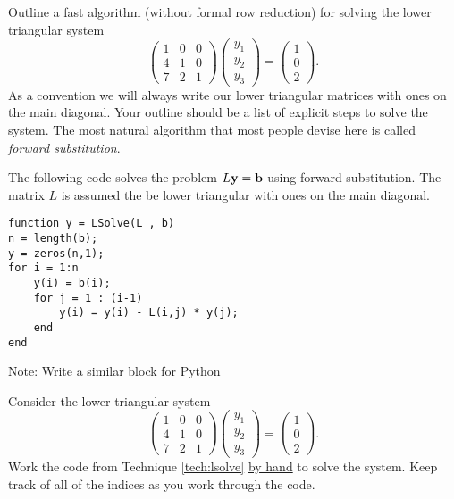 \begin{problem}
    Outline a fast algorithm (without formal row reduction) for solving the lower triangular system
    \[ \begin{pmatrix} 1 & 0 & 0 \\ 4 & 1 & 0 \\ 7 & 2 & 1 \end{pmatrix} \begin{pmatrix}
        y_1 \\ y_2 \\ y_3 \end{pmatrix} = \begin{pmatrix} 1 \\ 0 \\ 2\end{pmatrix}. \]
    As a convention we will always write our lower triangular matrices with ones on the
    main diagonal.  Your outline should be a list of explicit steps to solve the system.
    The most natural algorithm that most people devise here is called {\it forward
    substitution}.
\end{problem}


\begin{technique}\label{tech:lsolve}
    The following code solves the problem $L {\bf y} = {\bf b}$ using forward
    substitution.  The matrix $L$ is assumed the be lower triangular with ones on the main
    diagonal.
\begin{lstlisting}
function y = LSolve(L , b)
n = length(b);
y = zeros(n,1);
for i = 1:n
    y(i) = b(i);
    for j = 1 : (i-1)
        y(i) = y(i) - L(i,j) * y(j);
    end
end
\end{lstlisting}
\ifnum{} {\color{red} Note: Write a similar block for Python} \fi
\end{technique}

\begin{problem}
    Consider the lower triangular system 
    \[ \begin{pmatrix} 1 & 0 & 0 \\ 4 & 1 & 0 \\ 7 & 2 & 1 \end{pmatrix} \begin{pmatrix}
        y_1 \\ y_2 \\ y_3 \end{pmatrix} = \begin{pmatrix} 1 \\ 0 \\ 2\end{pmatrix}. \]
    Work the code from Technique \ref{tech:lsolve} \underline{by hand} to solve the
    system.  Keep track of all of the indices as you work through the code.
\end{problem}

